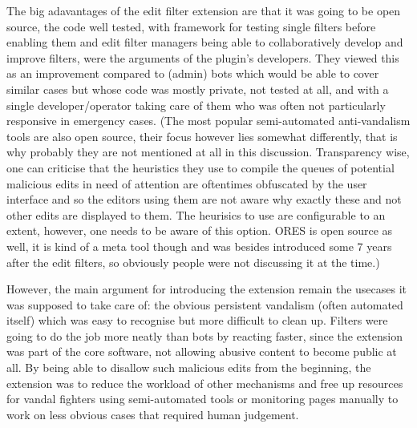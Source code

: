 The big adavantages of the edit filter extension are that it was going to be open source, the code well tested, with framework for testing single filters before enabling them and edit filter managers being able to collaboratively develop and improve filters, were the arguments of the plugin's developers.
They viewed this as an improvement compared to (admin) bots which would be able to cover similar cases but whose code was mostly private, not tested at all, and with a single developer/operator taking care of them who was often not particularly responsive in emergency cases.
(The most popular semi-automated anti-vandalism tools are also open source, their focus however lies somewhat differently, that is why probably they are not mentioned at all in this discussion.
Transparency wise, one can criticise that the heuristics they use to compile the queues of potential malicious edits in need of attention are oftentimes obfuscated by the user interface and so the editors using them are not aware why exactly these and not other edits are displayed to them.
The heurisics to use are configurable to an extent, however, one needs to be aware of this option. %
ORES is open source as well, it is kind of a meta tool though and was besides introduced some 7 years after the edit filters, so obviously people were not discussing it at the time.)

However, the main argument for introducing the extension remain the usecases it was supposed to take care of: the obvious persistent vandalism (often automated itself) which was easy to recognise but more difficult to clean up.
Filters were going to do the job more neatly than bots by reacting faster, since the extension was part of the core software, %
not allowing abusive content to become public at all.
By being able to disallow such malicious edits from the beginning, the extension was to reduce the workload of other mechanisms and free up resources for vandal fighters using semi-automated tools or monitoring pages manually to work on less obvious cases that required human judgement.

